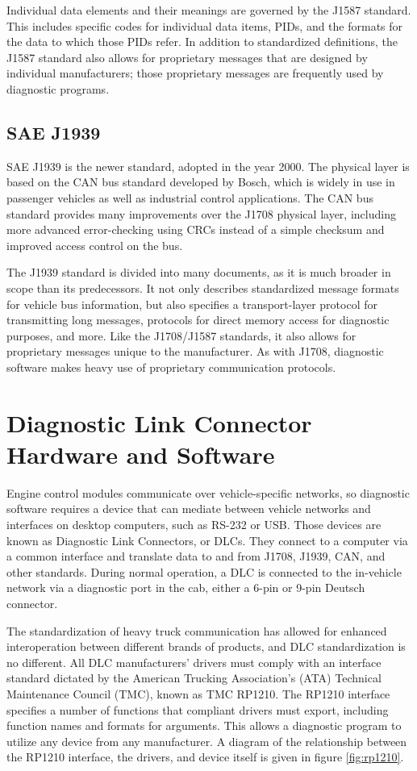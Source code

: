 \documentclass{report}
\begin{document}
Individual data elements and their meanings are governed by the J1587 standard.\cite{J1587} This includes specific codes for individual data items, PIDs,
and the formats for the data to which those PIDs refer. In addition to standardized definitions, the J1587 standard also allows for proprietary
messages that are designed by individual manufacturers; those proprietary messages are frequently used by diagnostic programs. 

\subsection{SAE J1939}

SAE J1939\cite{J1939-71} is the newer standard, adopted in the year 2000. The physical layer is based on the CAN bus standard developed by Bosch, which is widely in use
in passenger vehicles as well as industrial control applications. The CAN bus standard provides many improvements over the J1708 physical layer,
including more advanced error-checking using CRCs instead of a simple checksum and improved access control on the bus.

The J1939 standard is divided into many documents, as it is much broader in scope than its predecessors. It not only describes standardized
message formats for vehicle bus information, but also specifies a transport-layer protocol for transmitting long messages, protocols for
direct memory access for diagnostic purposes, and more. Like the J1708/J1587 standards, it also allows for proprietary messages unique
to the manufacturer. As with J1708, diagnostic software makes heavy use of proprietary communication protocols.

\section{Diagnostic Link Connector Hardware and Software}

Engine control modules communicate over vehicle-specific networks, so diagnostic software requires a device that can mediate between
vehicle networks and interfaces on desktop computers, such as RS-232 or USB. Those devices are known as Diagnostic Link Connectors, or DLCs.
They connect to a computer via a common interface and translate data to and from J1708, J1939, CAN, and other standards. During normal
operation, a DLC is connected to the in-vehicle network via a diagnostic port in the cab, either a 6-pin or 9-pin Deutsch connector.

The standardization of heavy truck communication has allowed for enhanced interoperation between different brands of products, and DLC
standardization is no different. All DLC manufacturers' drivers must comply with an interface standard dictated by the American Trucking Association's (ATA)
Technical Maintenance Council (TMC), known as TMC RP1210\cite{RP1210}. The RP1210 interface specifies a number of functions that compliant drivers must export,
including function names and formats for arguments. This allows a diagnostic program to utilize any device from any manufacturer. A diagram of the relationship between
the RP1210 interface, the drivers, and device itself is given in figure \ref{fig:rp1210}.
\end{document}
